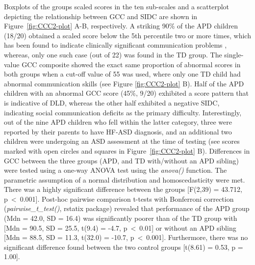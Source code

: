 \documentclass[a4paper, twoside]{templates/ociamthesis}
\begin{document}
Boxplots of the groups scaled scores in the ten sub-scales and a scatterplot depicting the relationship between GCC and SIDC are shown in Figure~\ref{fig:CCC2-plot} A-B, respectively. A striking 90\% of the APD children (18/20) obtained a scaled score below the 5th percentile two or more times, which has been found to indicate clinically significant communication problems \autocite{Bishop2003}, whereas, only one such case (out of 22) was found in the TD group. The single-value GCC composite showed the exact same proportion of abnormal scores in both groups when a cut-off value of 55 was used, where only one TD child had abnormal communication skills (see Figure \ref{fig:CCC2-plot} B). Half of the APD children with an abnormal GCC score (45\%, 9/20) exhibited a score pattern that is indicative of DLD, whereas the other half exhibited a negative SIDC, indicating social communication deficits as the primary difficulty. Interestingly, out of the nine APD children who fell within the latter category, three were reported by their parents to have HF-ASD diagnosis, and an additional two children were undergoing an ASD assessment at the time of testing (see scores marked with open circles and squares in Figure~\ref{fig:CCC2-plot} B). Differences in GCC between the three groups (APD, and TD with/without an APD sibling) were tested using a one-way ANOVA test using the \emph{anova()} function. The parametric assumption of a normal distribution and homoscedasticity were met. There was a highly significant difference between the groups {[}F(2,39) = 43.712, p~\textless~0.001{]}. Post-hoc pairwise comparison t-tests with Bonferroni correction (\emph{pairwise\_t\_test()}, rstatix package) revealed that performance of the APD group (Mdn = 42.0, SD = 16.4) was significantly poorer than of the TD group with {[}Mdn = 90.5, SD = 25.5, t(9.4) = -4.7, p~\textless~0.01{]} or without an APD sibling {[}Mdn = 88.5, SD = 11.3, t(32.0) = -10.7, p~\textless~0.001{]}. Furthermore, there was no significant difference found between the two control groups {[}t(8.61) = 0.53, p = 1.00{]}.\\
\end{document}
